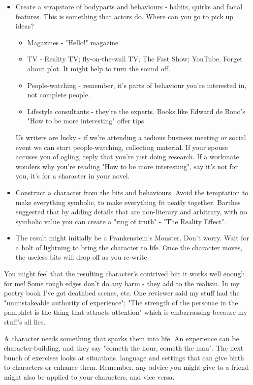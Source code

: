 \documentclass[11pt]{article}
\begin{document}
\begin{itemize}
\item  Create a scrapstore of bodyparts and behaviours - habits, quirks and facial features. This is something that actors do.
Where can you go to pick up ideas? 
\begin{itemize}
\item  Magazines - "Hello!" magazine
\item  TV - Reality TV; fly-on-the-wall TV; The Fast Show; YouTube. Forget about plot. It might help to turn the sound off.
\item  People-watching - remember, it's parts of behaviour you're interested in, not complete people.  
\item  Lifestyle consultants - they're the experts. Books like Edward de Bono's "How to be more interesting" offer tips 
\end{itemize}
Us writers are lucky - if we're attending a tedious business meeting or social event we can start people-watching, collecting material.
If your spouse accuses you of ogling, reply that you're just doing research. If a workmate wonders why you're reading "How to be more interesting", say it's not for you, it's for a character in your novel.

\item  Construct a character from the bits and behaviours. Avoid the temptation to make everything symbolic, to make everything fit neatly together. Barthes suggested that by adding details that are non-literary and arbitrary, with no symbolic value you can create a "ring of truth" - "The Reality Effect".

\item  The result might initially be a Frankenstein's Monster. Don't worry. Wait for a bolt of lightning to bring the character to life. Once the character moves, the useless bits will drop off as you re-write
\end{itemize}

You might feel that the resulting character's contrived but it works well
enough for me! Some rough edges don't do any harm - they add to the realism.
In my poetry book I've got deathbed scenes, etc. One reviewer said my stuff had the "unmistakeable authority of experience"; "The strength of the personae in the pamphlet is the thing that attracts attention" which is embarrassing because my stuff's all lies. 




A character needs something that sparks them into life. An experience can be character-building, and they say "cometh the hour, cometh the man". The next bunch of exercises looks at situations, language and settings that can give birth to characters or enhance them. Remember, any advice you might give to a friend might also be applied to your characters, and vice versa.
\end{document}
